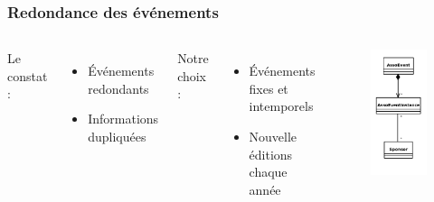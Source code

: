 \begin{frame}
    \frametitle{Redondance des événements}
    \begin{columns}
        Le constat :
        \begin{itemize}
            \item Événements redondants
            \item Informations dupliquées
        \end{itemize}
        \pause
        \vspace{2em}
        Notre choix :
        \begin{itemize}
            \item Événements fixes et intemporels
            \item Nouvelle éditions chaque année
        \end{itemize}

        \begin{figure}
            \centering
            \includegraphics[width=0.6\columnwidth]{pictures/assoevent-struct.png}
        \end{figure}
    \end{columns}
\end{frame}

